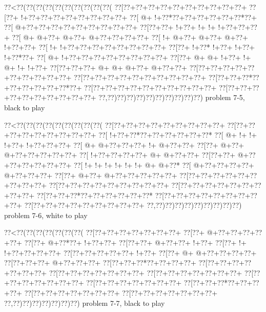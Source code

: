 \vbox{\vbox{\goo
\0??<\0??(\0??(\0??(\0??(\0??(\0??(\0??(\0??(\0??(\0??(
\0??[\0??+\0??+\0??+\0??+\0??+\0??+\0??+\0??+\0??+\0??+
\0??[\0??+\- !+\0??+\0??+\0??+\0??+\0??+\0??+\0??+\0??+
\0??[\- @+\- !+\0??*\0??+\0??+\0??+\0??+\0??+\0??*\0??+
\0??[\- @+\0??+\0??+\0??+\0??+\0??+\0??+\0??+\0??+\0??+
\0??[\0??+\0??+\- !+\0??+\- !+\- !+\- !+\0??+\0??+\0??+
\0??[\- @+\- @+\0??+\- @+\0??+\- @+\0??+\0??+\0??+\0??+
\0??[\- !+\- @+\0??+\- @+\0??+\- @+\0??+\- !+\0??+\0??+
\0??[\- !+\- !+\0??+\0??+\0??+\0??+\0??+\0??+\0??+\0??+
\0??[\0??+\- !+\0??*\- !+\0??+\- !+\0??+\- !+\0??*\0??+
\0??[\- @+\- !+\0??+\0??+\0??+\0??+\0??+\0??+\0??+\0??+
\0??[\0??+\- @+\- @+\- !+\0??+\- !+\- @+\- !+\- !+\0??+
\0??[\0??+\0??+\0??+\- @+\- @+\- @+\0??+\- @+\0??+\0??+
\0??[\0??+\0??+\0??+\0??+\0??+\0??+\0??+\0??+\0??+\0??+
\0??[\0??+\0??+\0??+\0??+\0??+\0??+\0??+\0??+\0??+\0??+
\0??[\0??+\0??+\0??*\0??+\0??+\0??+\0??+\0??+\0??*\0??+
\0??[\0??+\0??+\0??+\0??+\0??+\0??+\0??+\0??+\0??+\0??+
\0??[\0??+\0??+\0??+\0??+\0??+\0??+\0??+\0??+\0??+\0??+
\0??,\0??)\0??)\0??)\0??)\0??)\0??)\0??)\0??)\0??)\0??)
}
\hfil problem 7-5, black to play\hfil\break
}

\vbox{\vbox{\goo
\0??<\0??(\0??(\0??(\0??(\0??(\0??(\0??(\0??(\0??(
\0??[\0??+\0??+\0??+\0??+\0??+\0??+\0??+\0??+\0??+
\0??[\0??+\0??+\0??+\0??+\0??+\0??+\0??+\0??+\0??+
\0??[\- !+\0??+\0??*\0??+\0??+\0??+\0??+\0??+\0??*
\0??[\- @+\- !+\- !+\- !+\0??+\- !+\0??+\0??+\0??+
\0??[\- @+\- @+\0??+\0??+\0??+\- !+\- @+\0??+\0??+
\0??[\0??+\- @+\0??+\- @+\0??+\0??+\0??+\0??+\0??+
\0??[\- !+\0??+\0??+\0??+\0??+\- @+\- @+\0??+\0??+
\0??[\0??+\0??+\- @+\0??+\0??+\0??+\0??+\0??+\0??+
\0??[\- !+\- !+\- !+\- !+\- !+\- !+\- @+\- @+\0??*
\0??[\- @+\0??+\0??+\0??+\0??+\- @+\0??+\0??+\0??+
\0??[\0??+\- @+\0??+\- @+\0??+\0??+\0??+\0??+\0??+
\0??[\0??+\0??+\0??+\0??+\0??+\0??+\0??+\0??+\0??+
\0??[\0??+\0??+\0??+\0??+\0??+\0??+\0??+\0??+\0??+
\0??[\0??+\0??+\0??+\0??+\0??+\0??+\0??+\0??+\0??+
\0??[\0??+\0??+\0??*\0??+\0??+\0??+\0??+\0??+\0??*
\0??[\0??+\0??+\0??+\0??+\0??+\0??+\0??+\0??+\0??+
\0??[\0??+\0??+\0??+\0??+\0??+\0??+\0??+\0??+\0??+
\0??,\0??)\0??)\0??)\0??)\0??)\0??)\0??)\0??)\0??)
}
\hfil problem 7-6, white to play\hfil\break
}

\vbox{\vbox{\goo
\0??<\0??(\0??(\0??(\0??(\0??(\0??(\0??(
\0??[\0??+\0??+\0??+\0??+\0??+\0??+\0??+
\0??[\0??+\- @+\0??+\0??+\0??+\0??+\0??+
\0??[\0??+\- @+\0??*\0??+\- !+\0??+\0??+
\0??[\0??+\0??+\- @+\0??+\0??+\- !+\0??+
\0??[\0??+\- !+\- !+\0??+\0??+\0??+\0??+
\0??[\0??+\0??+\0??+\0??+\0??+\- !+\0??+
\0??[\0??+\- @+\- @+\0??+\0??+\0??+\0??+
\0??[\0??+\0??+\0??+\- @+\0??+\0??+\0??+
\0??[\0??+\0??+\0??*\0??+\0??+\0??+\0??+
\0??[\0??+\0??+\0??+\0??+\0??+\0??+\0??+
\0??[\0??+\0??+\0??+\0??+\0??+\0??+\0??+
\0??[\0??+\0??+\0??+\0??+\0??+\0??+\0??+
\0??[\0??+\0??+\0??+\0??+\0??+\0??+\0??+
\0??[\0??+\0??+\0??+\0??+\0??+\0??+\0??+
\0??[\0??+\0??+\0??*\0??+\0??+\0??+\0??+
\0??[\0??+\0??+\0??+\0??+\0??+\0??+\0??+
\0??[\0??+\0??+\0??+\0??+\0??+\0??+\0??+
\0??,\0??)\0??)\0??)\0??)\0??)\0??)\0??)
}
\hfil problem 7-7, black to play\hfil\break
}

